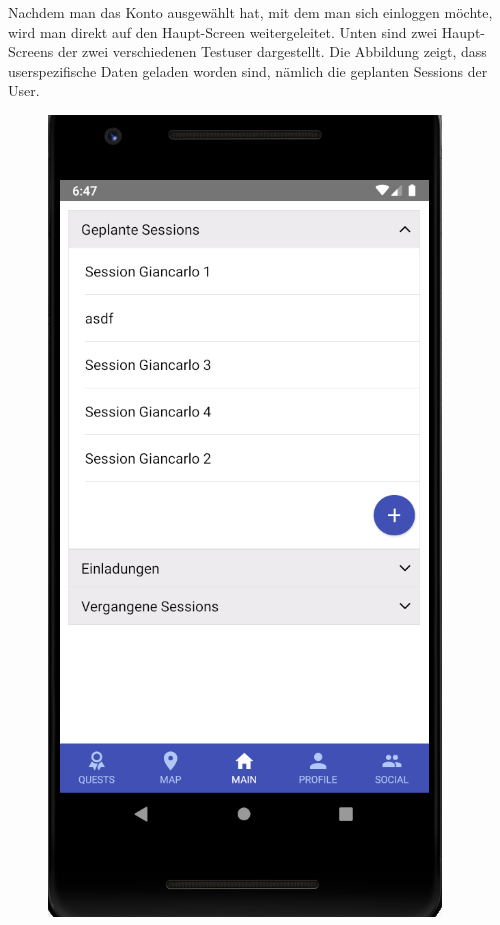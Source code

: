 Nachdem man das Konto ausgewählt hat, mit dem man sich einloggen möchte, wird man direkt auf den Haupt-Screen weitergeleitet. Unten sind zwei Haupt-Screens der zwei verschiedenen Testuser dargestellt. Die Abbildung zeigt, dass userspezifische Daten geladen worden sind, nämlich die geplanten Sessions der User.

\begin{figure}[H]
  \begin{minipage}[b]{0.4\textwidth}
    \includegraphics[width=\textwidth]{images/mainscreen_implementation1.PNG}

\end{minipage}
\end{figure}
